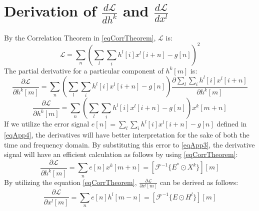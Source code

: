 \documentclass[journal]{IEEEtran}
\begin{document}
\section{Derivation of $\frac{d\mathcal{L}}{dh^k}$ and $\frac{d\mathcal{L}}{dx^l}$}
\label{secAppendix1}
By the Correlation Theorem in \eqref{eqCorrTheorem}, $\mathcal{L}$ is:
\begin{equation}
\label{eqApp1}
\mathcal{L}=\sum\limits_n \left( \sum\limits_l \sum\limits_i  h^l[i]x^l[i+n]-g[n] \right)^2
\end{equation}
The partial derivative for a particular component of $h^k[m]$ is:
\footnotesize
\begin{equation}
\label{eqApp2}
\frac{\partial \mathcal{L}}{\partial h^k[m]} = \sum\limits_n \left(\sum\limits_l \sum\limits_i h^l[i]x^l[i+n]-g[n]\right) \frac{\partial \sum_l \sum_i h^l[i] x^l[i+n]}{\partial h^k[m]}
\end{equation}
\begin{equation}
\label{eqApp3}
\frac{\partial \mathcal{L}}{\partial h^k[m]} = \sum\limits_n \left(\sum\limits_l \sum\limits_i h^l[i]x^l[i+n]-g[n]\right) x^k[m+n]
\end{equation}
\normalsize
If we utilize the error signal $e[n]=\sum\limits_l \sum\limits_i h^l[i]x^l[i+n]-g[n]$ defined in \eqref{eqApp4}, the derivatives will have better interpretation for the sake of both the time and frequency domain. By substituting this error to \eqref{eqApp3}, the derivative signal will have an efficient calculation as follows by using \eqref{eqCorrTheorem}:
\begin{equation}
\label{eqApp5}
\frac{\partial \mathcal{L}}{\partial h^k[m]}=
\sum\limits_n e[n]x^k[m+n]=[\mathcal{F}^{-1}\{E^* \odot X^k\}][m]
\end{equation}
By utilizing the equation \eqref{eqCorrTheorem}, $\frac{\partial \mathcal{L}}{\partial x^l[m]}$ can be derived as follows:
\begin{equation}
\label{eqApp6}
\frac{\partial \mathcal{L}}{\partial x^l[m]}=
\sum\limits_n e[n]h^l[m-n]=[\mathcal{F}^{-1}\{E \odot H^l\}][m]
\end{equation}
\end{document}
